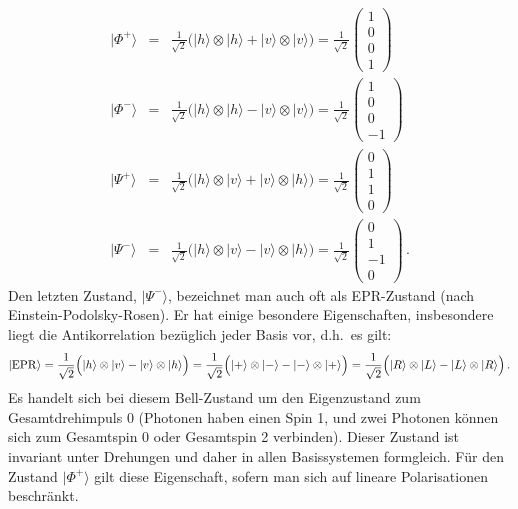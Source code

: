 \begin{eqnarray}
      |\Phi^+ \rangle &=&  \frac{1}{\sqrt{2}} \Big( |h\rangle \otimes |h\rangle + |v\rangle \otimes |v\rangle \Big)
            = \frac{1}{\sqrt{2}} \left( \begin{array}{c}  1 \\ 0 \\ 0 \\ 1 \end{array} \right)   \\[0.2cm]  
      |\Phi^- \rangle &=&  \frac{1}{\sqrt{2}} \Big( |h\rangle \otimes |h\rangle - |v\rangle \otimes |v\rangle \Big)
            = \frac{1}{\sqrt{2}} \left( \begin{array}{c}  1 \\ 0 \\ 0 \\ -1 \end{array} \right)   \\[0.2cm]
      |\Psi^+ \rangle &=&  \frac{1}{\sqrt{2}} \Big( |h\rangle \otimes |v\rangle + |v\rangle \otimes |h\rangle \Big)
            = \frac{1}{\sqrt{2}} \left( \begin{array}{c}  0 \\ 1 \\ 1 \\ 0 \end{array} \right)   \\[0.2cm]  
      |\Psi^- \rangle &=&  \frac{1}{\sqrt{2}} \Big( |h\rangle \otimes |v\rangle - |v\rangle \otimes |h\rangle \Big)
            = \frac{1}{\sqrt{2}} \left( \begin{array}{c}  0 \\ 1 \\ - 1 \\ 0 \end{array} \right)    \, .
\end{eqnarray}
Den letzten Zustand, $|\Psi^- \rangle$, bezeichnet man auch oft als EPR-Zustand (nach Einstein-Podolsky-Rosen). 
Er hat einige besondere Eigenschaften, insbesondere liegt die Antikorrelation bez\"uglich jeder Basis vor, d.h.\
es gilt:
\begin{equation}
  |{\rm EPR} \rangle = \frac{1}{\sqrt{2}} \Big( |h\rangle \otimes |v\rangle - |v\rangle \otimes |h\rangle \Big) 
  = \frac{1}{\sqrt{2}} \Big( |+\rangle \otimes |-\rangle - |-\rangle \otimes |+\rangle \Big) =
    \frac{1}{\sqrt{2}} \Big( |R\rangle \otimes |L\rangle - |L\rangle \otimes |R\rangle \Big) \, .
\end{equation}
Es handelt sich bei diesem Bell-Zustand um den Eigenzustand zum Gesamtdrehimpuls 0 (Photonen haben einen
Spin 1, und zwei Photonen k\"onnen sich zum Gesamtspin 0 oder Gesamtspin 2 verbinden). Dieser Zustand
ist invariant unter Drehungen und daher in allen Basissystemen formgleich. F\"ur den Zustand $|\Phi^+\rangle$
gilt diese Eigenschaft, sofern man sich auf lineare Polarisationen beschr\"ankt.%
\index{QuBit|)}
 


